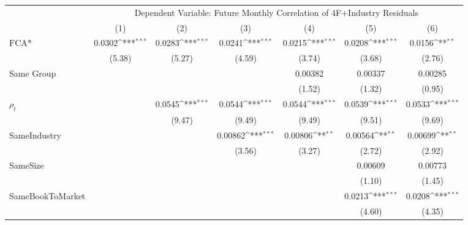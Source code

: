 {
\def\sym#1{\ifmmode^{#1}\else\(^{#1}\)\fi}
\begin{tabular}{l*{6}{c}}
\hline\hline
                &\multicolumn{6}{c}{Dependent Variable: Future Monthly Correlation of 4F+Industry Residuals}                      \\\cmidrule(lr){2-7}
                &\multicolumn{1}{c}{(1)}         &\multicolumn{1}{c}{(2)}         &\multicolumn{1}{c}{(3)}         &\multicolumn{1}{c}{(4)}         &\multicolumn{1}{c}{(5)}         &\multicolumn{1}{c}{(6)}         \\
\hline
$ \text{FCA*} $ &   0.0302\sym{***}&   0.0283\sym{***}&   0.0241\sym{***}&   0.0215\sym{***}&   0.0208\sym{***}&   0.0156\sym{**} \\
                &   (5.38)         &   (5.27)         &   (4.59)         &   (3.74)         &   (3.68)         &   (2.76)         \\
[1em]
Same Group      &                  &                  &                  &  0.00382         &  0.00337         &  0.00285         \\
                &                  &                  &                  &   (1.52)         &   (1.32)         &   (0.95)         \\
[1em]
 $ {\rho_t} $   &                  &   0.0545\sym{***}&   0.0544\sym{***}&   0.0544\sym{***}&   0.0539\sym{***}&   0.0533\sym{***}\\
                &                  &   (9.47)         &   (9.49)         &   (9.49)         &   (9.51)         &   (9.69)         \\
[1em]
SameIndustry    &                  &                  &  0.00862\sym{***}&  0.00806\sym{**} &  0.00564\sym{**} &  0.00699\sym{**} \\
                &                  &                  &   (3.56)         &   (3.27)         &   (2.72)         &   (2.92)         \\
[1em]
SameSize        &                  &                  &                  &                  &  0.00609         &  0.00773         \\
                &                  &                  &                  &                  &   (1.10)         &   (1.45)         \\
[1em]
SameBookToMarket&                  &                  &                  &                  &   0.0213\sym{***}&   0.0208\sym{***}\\
                &                  &                  &                  &                  &   (4.60)         &   (4.35)         \\

\end{tabular}}
